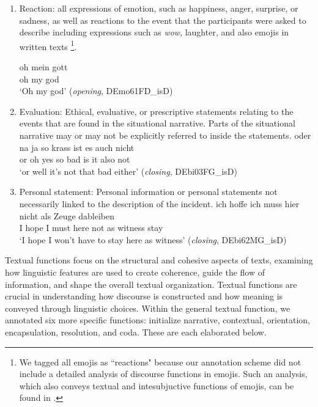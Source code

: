 \documentclass[output=paper,colorlinks,citecolor=brown]{langscibook}
\begin{document}
 \begin{enumerate}[label=(\alph*)]
    \item Reaction: all expressions of emotion, such as happiness, anger, surprise, or sadness, as well as reactions to the event that the participants were asked to describe including expressions such as \textit{wow}, laughter, and also emojis  in written texts \footnote{We tagged all emojis as ``reactions" because our annotation scheme did not include a detailed analysis of discourse functions in emojis. Such an analysis, which also conveys textual and intesubjuctive functions of emojis, can be found in \textcite{van_olmen_chapter_2021}.}.  
    
    \ea \label{katsikaetal:sixteenreaction}
\gll oh mein gott\\
     oh my   god\\
\glt `Oh my god' (\textit{opening}, DEmo61FD\_isD)
\z

\item Evaluation: Ethical, evaluative, or prescriptive statements relating to the events that are found in the situational narrative. Parts of the situational narrative may or may not be explicitly referred to inside the statements.   
    \ea \label{katsikaetal:seventeenevaluation}
\gll oder na ja  so krass ist es auch nicht\\
     or   oh yes so bad   is  it also not\\
\glt `or well it's not that bad either' (\textit{closing}, DEbi03FG\_isD)
\z

\item Personal statement: Personal information or personal statements not necessarily linked to the description of the incident.   
    \ea \label{katsikaetal:eighteenpersonal}
\gll ich hoffe ich muss hier nicht als Zeuge   dableiben\\
     I   hope  I   must here not   as  witness stay\\
\glt `I hope I won't have to stay here as witness' (\textit{closing}, DEbi62MG\_isD)
\z

\end{enumerate}

Textual functions focus on the structural and cohesive aspects of texts, examining how linguistic features are used to create coherence, guide the flow of information, and shape the overall textual organization. Textual functions are crucial in understanding how discourse is constructed and how meaning is conveyed through linguistic choices. Within the general textual function, we annotated six more specific functions: initialize narrative, contextual, orientation, encapsulation, resolution, and coda. These are each elaborated below.
\end{document}
